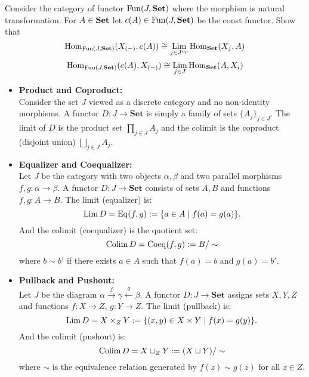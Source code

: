 \begin{exercise}
  Consider the category of functor $ \mathrm{Fun}(J,\mathbf{Set})$ where the morphism is natural transformation. For $A\in \mathbf{Set}$ let $c(A) \in \mathrm{Fun}(J,\mathbf{Set})$ be the const functor. Show that 
\[
  \mathrm{Hom}_{\mathrm{Fun}(J,\mathbf{Set})}(X_{(-)},c(A)) \cong \operatorname*{\mathrm{Lim}}_{j\in J^{\mathrm{op}}} \mathrm{Hom}_{\mathbf{Set}}(X_j , A) 
\]
\[
  \mathrm{Hom}_{\mathrm{Fun}(J,\mathbf{Set})}(c(A),X_{(-)}) \cong \operatorname*{\mathrm{Lim}}_{j\in J} \mathrm{Hom}_{\mathbf{Set}}(A, X_i ) 
\]
\end{exercise}
\begin{example}
  \begin{itemize}
    \item \textbf{Product and Coproduct:} \\
      Consider the set $J$ viewed as a discrete category  and no non-identity morphisms. A functor $D : J \to \mathbf{Set}$ is simply a family of sets $\{A_j\}_{j\in J}$. The limit of $D$ is the product set $\prod_{j\in J} A_j$ and the colimit is the coproduct (disjoint union) $\bigsqcup_{j\in J} A_j$.

    \item \textbf{Equalizer and Coequalizer:} \\
    Let $J$ be the category with two objects $\alpha,\beta$ and two parallel morphisms $f, g : \alpha \to \beta$. A functor $D : J \to \mathbf{Set}$ consists of sets $A, B$ and functions $f, g : A \to B$. The limit (equalizer) is:
    \[
      \operatorname*{\mathrm{Lim}} D = \mathrm{Eq}(f,g):= \{ a \in A \mid f(a) = g(a) \}.
    \]
    And the colimit (coequalizer) is the quotient set:
    \[
    \operatorname*{\mathrm{Colim}} D = \mathrm{Coeq}(f,g):=B / \sim
    \]
    where $b \sim b'$ if there exists $a \in A$ such that $f(a) = b$ and $g(a) = b'$.
    \item \textbf{Pullback and Pushout: } \\
    Let $J$ be the diagram $\alpha \xrightarrow{f} \gamma \xleftarrow{g} \beta$. A functor $D : J \to \mathbf{Set}$ assigns sets $X, Y, Z$ and functions $f : X \to Z$, $g : Y \to Z$. The limit (pullback) is:
    \[
    \operatorname*{\mathrm{Lim}} D = X \times_Z Y := \{ (x, y) \in X \times Y \mid f(x) = g(y) \}.
    \]
  And the colimit (pushout) is:
    \[
    \operatorname*{\mathrm{Colim}} D = X \sqcup_Z Y := (X \sqcup Y) / \sim
    \]
    where $\sim$ is the equivalence relation generated by $f(z) \sim g(z)$ for all $z \in Z$.

   \end{itemize}
\end{example}
